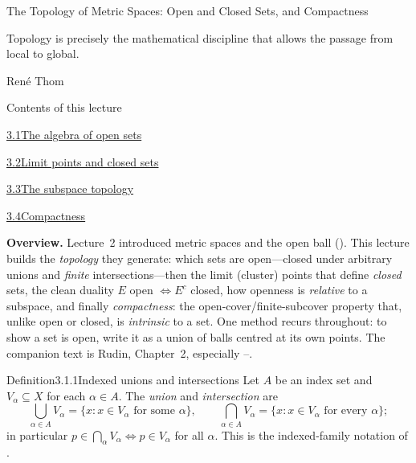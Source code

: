 \documentclass[main.tex]{subfiles}
\begin{document}
%
  {The Topology of Metric Spaces: Open and Closed Sets, and Compactness}

\epigraph{Topology is precisely the mathematical discipline that allows the passage from local to global.}{René Thom}

\begin{lecturecontents}{Contents of this lecture}
  \item \hyperlink{3.1}{3.1\quad The algebra of open sets}
  \item \hyperlink{3.2}{3.2\quad Limit points and closed sets}
  \item \hyperlink{3.3}{3.3\quad The subspace topology}
  \item \hyperlink{3.4}{3.4\quad Compactness}
\end{lecturecontents}

\bigskip
\noindent\textbf{Overview.} Lecture~2 introduced metric spaces and the open ball ().
This lecture builds the \emph{topology} they generate: which sets are open---closed under arbitrary
unions and \emph{finite} intersections---then the limit (cluster) points that define \emph{closed}
sets, the clean duality $E$ open $\iff E^c$ closed, how openness is \emph{relative} to a subspace,
and finally \emph{compactness}: the open-cover/finite-subcover property that, unlike open or closed,
is \emph{intrinsic} to a set. One method recurs throughout: to show a set is open, write it as a
union of balls centred at its own points.
The companion text is Rudin, Chapter~2, especially --.

\clearpage

\begin{Obj}{Definition}{3.1.1}{Indexed unions and intersections}
Let $A$ be an index set and $V_\alpha\subseteq X$ for each $\alpha\in A$. The \emph{union} and
\emph{intersection} are
\[ \bigcup_{\alpha\in A}V_\alpha=\{x:x\in V_\alpha\text{ for some }\alpha\},\qquad
   \bigcap_{\alpha\in A}V_\alpha=\{x:x\in V_\alpha\text{ for every }\alpha\}; \]
in particular $p\in\bigcap_{\alpha}V_\alpha \iff p\in V_\alpha$ for all $\alpha$.
This is the indexed-family notation of .
\end{Obj}
\end{document}
